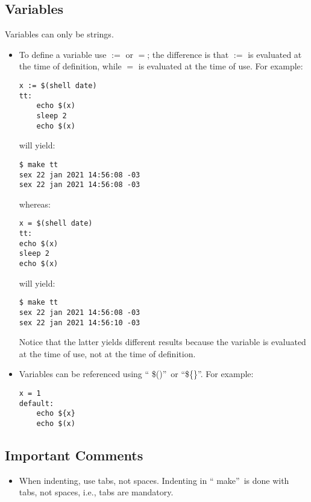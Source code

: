 \subsection{Variables}

Variables can only be strings. 
\begin{itemize}
    \item To define a variable use $:=$ or $=$; the difference is that $:=$ is
    evaluated at the time of definition, while $=$ is evaluated at the time of
    use. For example:
    \begin{verbatim}
x := $(shell date)
tt:
    echo $(x)
    sleep 2
    echo $(x)
    \end{verbatim}
    will yield:
    \begin{verbatim}
$ make tt
sex 22 jan 2021 14:56:08 -03
sex 22 jan 2021 14:56:08 -03
    \end{verbatim}
    whereas:
    \begin{verbatim}
x = $(shell date)
tt:
echo $(x)
sleep 2
echo $(x)
    \end{verbatim}
    will yield:
    \begin{verbatim}
$ make tt
sex 22 jan 2021 14:56:08 -03
sex 22 jan 2021 14:56:10 -03
    \end{verbatim}
    Notice that the latter yields different results because the variable is 
    evaluated at the time of use, not at the time of definition.
    \item Variables can be referenced using \textquotedblleft
    \$()\textquotedblright\ or \textquotedblleft \$\{\}\textquotedblright. For
    example:
    \begin{verbatim}
x = 1
default:
    echo ${x}
    echo $(x)
    \end{verbatim}
\end{itemize}

\subsection{Important Comments}
\begin{itemize}
    \item When indenting, use tabs, not spaces. Indenting in \textquotedblleft
    make\textquotedblright\ is done with tabs, not spaces, i.e., tabs are
    mandatory.
\end{itemize}
